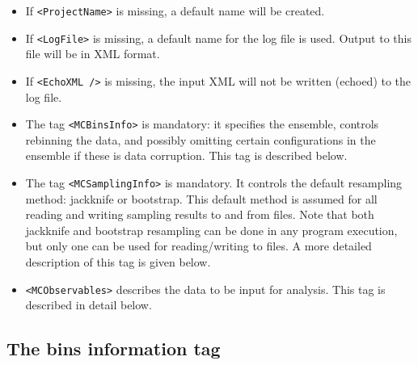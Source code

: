 \documentclass[12pt]{article}
\newcommand{\vb}{\texttt}
\begin{document}
\begin{itemize} 
\item                                                 
 If \vb{<ProjectName>} is missing, a default name will be created.
\item                                                                   
 If \vb{<LogFile>} is missing, a default name for the log file is used. 
Output to this file will be in XML format.
\item                                                              
 If \vb{<EchoXML />} is missing, the input XML will not be written (echoed)
 to the log file. 
\item                                                                   
 The tag \vb{<MCBinsInfo>} is mandatory: it specifies the ensemble,
 controls rebinning the data, and possibly omitting certain configurations 
 in the ensemble if these is data corruption.  This tag is described below.                                                      
\item                                                                   
 The tag \vb{<MCSamplingInfo>} is mandatory.  It controls the default
 resampling method:  jackknife or bootstrap.  This default method
 is assumed for all reading and writing sampling results to and
 from files.  Note that both jackknife and bootstrap resampling
 can be done in any program execution, but only one can be used 
 for reading/writing to files.  A more detailed 
 description of this tag is given below.    
\item                                                                   
 \vb{<MCObservables>} describes the data to be input for analysis. This
 tag is described in detail below.       
\end{itemize}                                                                    

\subsection{The bins information tag}
\end{document}
